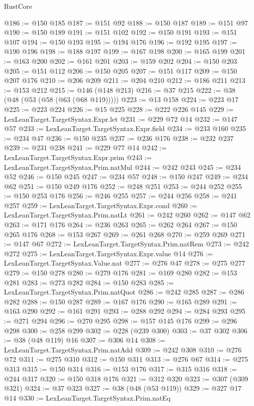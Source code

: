 \begin{lexlean}{RustCore}
\begin{coremodule}
@186 := @150 @185
@187 := @151 @92
@188 := @150 @187
@189 := @151 @97
@190 := @150 @189
@191 := @151 @102
@192 := @150 @191
@193 := @151 @107
@194 := @150 @193
@195 := @194 @176
@196 := @192 @195
@197 := @190 @196
@198 := @188 @197
@199 := @167 @198
@200 := @165 @199
@201 := @163 @200
@202 := @161 @201
@203 := @159 @202
@204 := @150 @203
@205 := @151 @112
@206 := @150 @205
@207 := @151 @117
@209 := @150 @207 @176
@210 := @206 @209
@211 := @204 @210
@212 := @186 @211
@213 := @153 @212
@215 := @146 (@148 @213)
@216 := @37 @215
@222 := @38 (@48 (@53 (@58 (@63 (@68 @119)))))
@223 := @13 @158
@224 := @223 @17
@225 := @223 @224
@226 := @15 @225
@228 := @222 @226 @145
@229 := LexLeanTarget.TargetSyntax.Expr.let
@231 := @229 @72 @14
@232 := @147 @57
@233 := LexLeanTarget.TargetSyntax.Expr.field
@234 := @233 @160
@235 := @234 @47
@236 := @150 @235
@237 := @236 @176
@238 := @232 @237
@239 := @231 @238
@241 := @229 @77 @14
@242 := LexLeanTarget.TargetSyntax.Expr.prim
@243 := LexLeanTarget.TargetSyntax.Prim.natMul
@244 := @242 @243
@245 := @234 @52
@246 := @150 @245
@247 := @234 @57
@248 := @150 @247
@249 := @234 @62
@251 := @150 @249 @176
@252 := @248 @251
@253 := @244 @252
@255 := @150 @253 @176
@256 := @246 @255
@257 := @244 @256
@258 := @241 @257
@259 := LexLeanTarget.TargetSyntax.Expr.cond
@260 := LexLeanTarget.TargetSyntax.Prim.natLt
@261 := @242 @260
@262 := @147 @62
@263 := @171 @176
@264 := @236 @263
@265 := @262 @264
@267 := @150 @265 @176
@268 := @153 @267
@269 := @261 @268
@270 := @259 @269
@271 := @147 @67
@272 := LexLeanTarget.TargetSyntax.Prim.natRem
@273 := @242 @272
@275 := LexLeanTarget.TargetSyntax.Expr.value @14
@276 := LexLeanTarget.TargetSyntax.Value.nat
@277 := @276 @47
@278 := @275 @277
@279 := @150 @278
@280 := @279 @176
@281 := @169 @280
@282 := @153 @281
@283 := @273 @282
@284 := @150 @283
@285 := LexLeanTarget.TargetSyntax.Prim.natQuot
@286 := @242 @285
@287 := @286 @282
@288 := @150 @287
@289 := @167 @176
@290 := @165 @289
@291 := @163 @290
@292 := @161 @291
@293 := @288 @292
@294 := @284 @293
@295 := @271 @294
@296 := @270 @295
@298 := @157 @145 @176
@299 := @296 @298
@300 := @258 @299
@302 := @228 (@239 @300)
@303 := @37 @302
@306 := @38 (@48 @119) @16
@307 := @306 @14
@308 := LexLeanTarget.TargetSyntax.Prim.natAdd
@309 := @242 @308
@310 := @276 @72
@311 := @275 @310
@312 := @150 @311
@313 := @276 @67
@314 := @275 @313
@315 := @150 @314
@316 := @153 @176
@317 := @315 @316
@318 := @244 @317
@320 := @150 @318 @176
@321 := @312 @320
@323 := @307 (@309 @321)
@324 := @37 @323
@327 := @38 (@48 (@53 @119))
@329 := @327 @17 @14
@330 := LexLeanTarget.TargetSyntax.Prim.natEq

\end{coremodule}
\end{lexlean}
